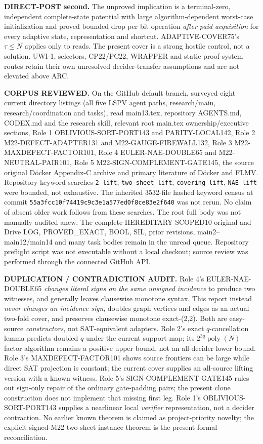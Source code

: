\documentclass[11pt]{article}
\begin{document}
\textbf{DIRECT-POST second.} The unproved implication is a
terminal-zero, independent complete-state potential with large
algorithm-dependent worst-case initialization and proved bounded
drop per bit operation \emph{after paid acquisition} for every
adaptive state, representation and shortcut. ADAPTIVE-COVER75's
\(\tau\le N\) applies only to reads. The present cover is a strong
hostile control, not a solution. UWI-1, selectors, CP22/PC22,
WRAPPER and static proof-system routes retain their own unresolved
decider-transfer assumptions and are not elevated above ARC.

\textbf{CORPUS REVIEWED.} On the GitHub default branch, surveyed
eight current directory listings (all five LSPV agent paths,
research/main, research/coordination and tasks), read main13.tex,
repository AGENTS.md, CODEX.md and the research skill, relevant root
main.tex ownership/executive sections, Role 1
OBLIVIOUS-SORT-PORT143 and PARITY-LOCAL142, Role 2
M22-DEFECT-ADAPTER131 and M22-GAUGE-FIREWALL132,
Role 3 M22-MAXDEFECT-FACTOR101, Role 4 EULER-NAE-DOUBLE65
and M22-NEUTRAL-PAIR101, Role 5 M22-SIGN-COMPLEMENT-GATE145,
the source original D\"ocker Appendix-C archive and primary
literature of D\"ocker and FLMV.
Repository keyword searches \texttt{2-lift}, \texttt{two-sheet lift},
\texttt{covering lift}, \texttt{NAE lift} were bounded, not exhaustive.
The inherited 3532-file hashed keyword census at commit
\texttt{55a3fcc10f74419c9c3e1a577ed0f8ce83e2f640}
was not rerun. No claim of absent older work follows from these searches.
The root full body was not manually audited anew. The complete
HEREDITARY-SCOPED10 original and Drive LOG, PROVED\_EXACT, BOOL,
SIL, prior revisions, main2--main12/main14 and many task bodies
remain in the unread queue. Repository preflight script was
not executable without a local checkout; source review was performed
through the connected GitHub API.

\textbf{DUPLICATION / CONTRADICTION AUDIT.}
Role 4's EULER-NAE-DOUBLE65 \emph{changes literal signs on the same
unsigned incidence} to produce two witnesses, and generally leaves
clausewise monotone syntax. This report instead \emph{never changes
an incidence sign}, doubles graph vertices and edges as an
actual two-fold cover, and preserves clausewise monotone exact-(2,2).
Both are easy-source \emph{constructors}, not SAT-equivalent adapters.
Role 2's exact \(q\)-cancellation lemma predicts doubled \(q\)
under the current support map; its \(2^{3q}\operatorname{poly}(N)\)
factor algorithm remains a positive upper bound, not an all-decider
lower bound. Role 3's MAXDEFECT-FACTOR101 shows source frontiers can
be large while direct SAT projection is constant; the current
cover supplies an all-source lifting version with a known witness.
Role 5's SIGN-COMPLEMENT-GATE145 rules out sign-only repair of
the ordinary gate-padding pairs; the present clone construction
does not implement that missing first leg. Role 1's
OBLIVIOUS-SORT-PORT143 supplies a nearlinear local
\emph{verifier} representation, not a decider contraction.
No earlier known theorem is claimed as project-priority novelty;
the explicit signed-M22 two-sheet instance theorem is the present
formal reconciliation.
\end{document}
